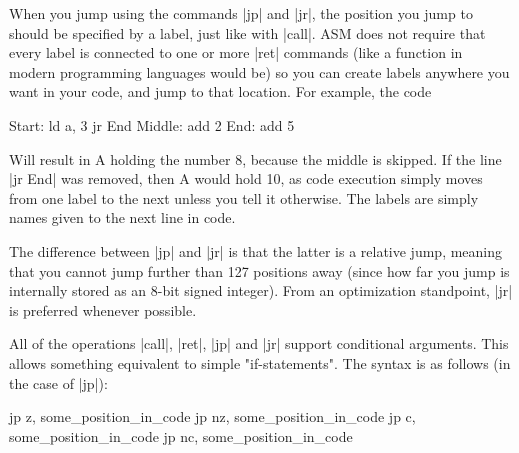 \documentclass[11pt]{book}
\begin{document}
When you jump using the commands |jp| and |jr|, the position you jump to should be specified by a label, just like with |call|. ASM does not require that every label is connected to one or more |ret| commands (like a function in modern programming languages would be) so you can create labels anywhere you want in your code, and jump to that location. For example, the code 

\begin{code}
Start:
  ld a, 3
  jr End
Middle:
  add 2
End:
  add 5
\end{code}

Will result in A holding the number 8, because the middle is skipped. If the line |jr End| was removed, then A would hold 10, as code execution simply moves from one label to the next unless you tell it otherwise. The labels are simply names given to the next line in code.

The difference between |jp| and |jr| is that the latter is a relative jump, meaning that you cannot jump further than 127 positions away (since how far you jump is internally stored as an 8-bit signed integer). From an optimization standpoint, |jr| is preferred whenever possible.

All of the operations |call|, |ret|, |jp| and |jr| support conditional arguments. This allows something equivalent to simple "if-statements". The syntax is as follows (in the case of |jp|):

\begin{code}
jp z, some_position_in_code
jp nz, some_position_in_code 
jp c, some_position_in_code
jp nc, some_position_in_code 
\end{code}
\end{document}
